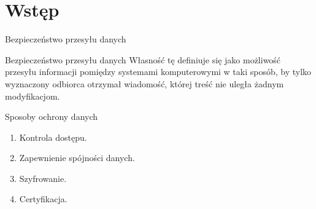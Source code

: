 \section{Wstęp}

\begin{frame}{Bezpieczeństwo przesyłu danych}
	\begin{alertblock}{Bezpieczeństwo przesyłu danych}
		Własność tę definiuje się jako możliwość przesyłu informacji pomiędzy systemami komputerowymi w taki sposób, by tylko wyznaczony odbiorca otrzymał wiadomość, której treść nie uległa żadnym modyfikacjom. 	
	\end{alertblock}
\end{frame}

\begin{frame}{Sposoby ochrony danych}
	\begin{enumerate}
		\item Kontrola dostępu.
		\item Zapewnienie spójności danych.
		\item Szyfrowanie.
		\item Certyfikacja.	
	\end{enumerate} 
\end{frame}